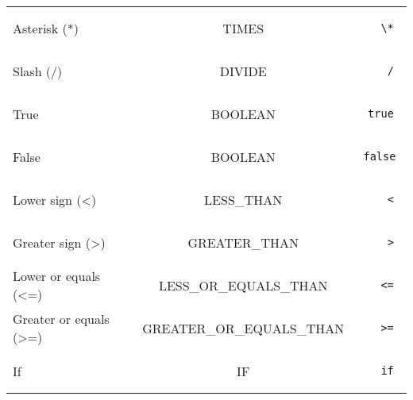 \documentclass[a4paper,10pt]{article}
\begin{document}
\begin{tabular}{|l|c|r|}
Asterisk (*) & TIMES & \begin{minipage}{2in} \begin{verbatim} \* \end{verbatim} \end{minipage} \\
Slash (/) & DIVIDE & \begin{minipage}{2in} \begin{verbatim} / \end{verbatim} \end{minipage} \\
True & BOOLEAN & \begin{minipage}{2in} \begin{verbatim} true \end{verbatim} \end{minipage} \\
False & BOOLEAN & \begin{minipage}{2in} \begin{verbatim} false \end{verbatim} \end{minipage} \\
Lower sign (<) & LESS\_THAN & \begin{minipage}{2in} \begin{verbatim} < \end{verbatim} \end{minipage} \\
Greater sign (>) & GREATER\_THAN & \begin{minipage}{2in} \begin{verbatim} > \end{verbatim} \end{minipage} \\
Lower or equals (<=) & LESS\_OR\_EQUALS\_THAN & \begin{minipage}{2in} \begin{verbatim} <= \end{verbatim} \end{minipage} \\
Greater or equals (>=) & GREATER\_OR\_EQUALS\_THAN & \begin{minipage}{2in} \begin{verbatim} >= \end{verbatim} \end{minipage} \\
If & IF & \begin{minipage}{2in} \begin{verbatim} if \end{verbatim} \end{minipage} \\

\end{tabular}
\end{document}
